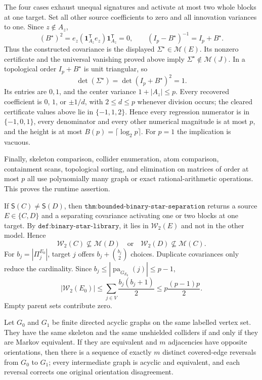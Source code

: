 The four cases exhaust unequal signatures and activate at most two whole blocks at one target.  Set all other source coefficients to zero and all innovation variances to one.  Since \(z\notin A_z\),
\[
 (B^{\star})^2=e_z(\mathbf 1_{A_z}^{\mathsf T}e_z)\mathbf 1_{A_z}^{\mathsf T}=0,
 \qquad (I_p-B^{\star})^{-1}=I_p+B^{\star}.
\]
Thus the constructed covariance is the displayed \(\Sigma^{\star}\in\mathcal M(E)\).  Its nonzero certificate and the universal vanishing proved above imply \(\Sigma^{\star}\notin\mathcal M(J)\).  In a topological order \(I_p+B^{\star}\) is unit triangular, so
\[
 \det(\Sigma^{\star})=\det(I_p+B^{\star})^2=1.
\]
Its entries are \(0,1\), and the center variance \(1+|A_z|\le p\).  Every recovered coefficient is \(0\), \(1\), or \(\pm1/d\), with \(2\le d\le p\) whenever division occurs; the cleared certificate values above lie in \(\{-1,1,2\}\).  Hence every regression numerator is in \(\{-1,0,1\}\), every denominator and every other numerical magnitude is at most \(p\), and the height is at most \(B(p)=\lceil\log_2p\rceil\).  For \(p=1\) the implication is vacuous.

Finally, skeleton comparison, collider enumeration, atom comparison, containment scans, topological sorting, and elimination on matrices of order at most \(p\) all use polynomially many graph or exact rational-arithmetic operations.  This proves the runtime assertion.

If \(\mathsf S(C)\ne\mathsf S(D)\), then \(\texttt{thm:bounded-binary-star-separation}\) returns a source \(E\in\{C,D\}\) and a separating covariance activating one or two blocks at one target.  By \(\texttt{def:binary-star-library}\), it lies in \(\mathcal W_2(E)\) and not in the other model.  Hence
\[
 \mathcal W_2(C)\not\subseteq\mathcal M(D)
 \quad\text{or}\quad
 \mathcal W_2(D)\not\subseteq\mathcal M(C).
\]
For \(b_j=|\Pi^{E_0}_j|\), target \(j\) offers \(b_j+\binom{b_j}{2}\) choices.  Duplicate covariances only reduce the cardinality.  Since \(b_j\le|\operatorname{pa}_{G_{E_0}}(j)|\le p-1\),
\[
 |\mathcal W_2(E_0)|
 \le\sum_{j\in V}\frac{b_j(b_j+1)}2
 \le p\frac{(p-1)p}{2}.
\]
Empty parent sets contribute zero.

Let \(G_0\) and \(G_1\) be finite directed acyclic graphs on the same labelled vertex set.  They have the same skeleton and the same unshielded colliders if and only if they are Markov equivalent.  If they are equivalent and \(m\) adjacencies have opposite orientations, then there is a sequence of exactly \(m\) distinct covered-edge reversals from \(G_0\) to \(G_1\); every intermediate graph is acyclic and equivalent, and each reversal corrects one original orientation disagreement.

